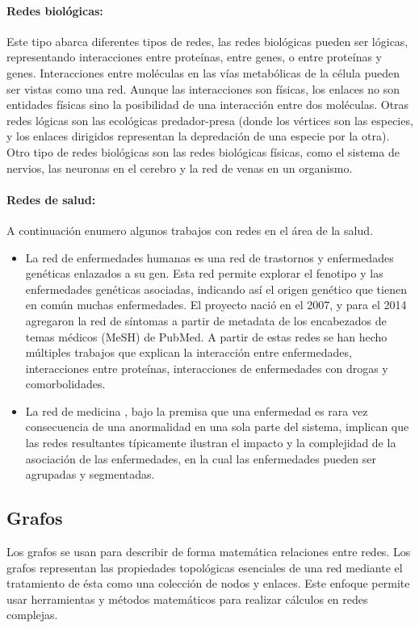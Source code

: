 \paragraph{Redes biológicas:}Este tipo abarca diferentes tipos de redes, las redes biológicas pueden ser lógicas, representando interacciones entre proteínas, entre genes, o entre proteínas y genes. Interacciones entre moléculas en las vías metabólicas de la célula pueden ser vistas como una red. Aunque las interacciones son físicas, los enlaces no son entidades físicas sino la posibilidad de una interacción entre dos moléculas. Otras redes lógicas son las ecológicas predador-presa (donde los vértices son las especies, y los enlaces dirigidos representan la depredación de una especie por la otra). Otro tipo de redes biológicas son las redes biológicas físicas, como el sistema de nervios, las neuronas en el cerebro y la red de venas en un organismo. \cite{Cohen2010}
 
\paragraph{Redes de salud:} A continuación enumero algunos trabajos con redes en el área de la salud.
\begin{itemize}
\item La red de enfermedades humanas \cite{Goh2007TheNetwork.} es una red de trastornos y enfermedades genéticas enlazados a su gen. Esta red permite explorar el fenotipo y las enfermedades genéticas asociadas, indicando así el origen genético que tienen en común muchas enfermedades. El proyecto nació en el 2007, y para el 2014 agregaron la red de síntomas a partir de metadata de los encabezados de temas médicos (MeSH) de PubMed. A partir de estas redes se han hecho múltiples trabajos que explican la interacción entre enfermedades, interacciones entre proteínas, interacciones de enfermedades con drogas y comorbolidades.
\item La red de medicina \cite{Haaren2013,Barabasi2011NetworkDisease}, bajo la premisa que una enfermedad es rara vez consecuencia de una anormalidad en una sola parte del sistema, implican que las redes resultantes típicamente ilustran el impacto y la complejidad de la asociación de las enfermedades, en la cual las enfermedades pueden ser agrupadas y segmentadas.
\end{itemize}

\subsection{Grafos}
Los grafos se usan para describir de forma matemática relaciones entre redes. Los grafos representan las propiedades topológicas esenciales de una red mediante el tratamiento de ésta como una colección de nodos y enlaces. Este enfoque permite usar herramientas y métodos matemáticos para realizar cálculos en redes complejas.

